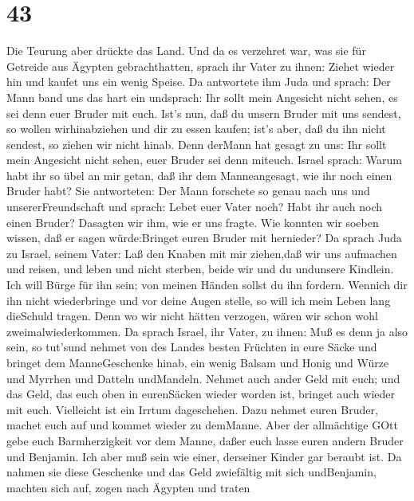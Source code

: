 \hypertarget{section-42}{%
\section{43}\label{section-42}}

 Die Teurung aber drückte das Land.  Und da es
verzehret war, was sie für Getreide aus Ägypten gebrachthatten, sprach
ihr Vater zu ihnen: Ziehet wieder hin und kaufet uns ein wenig Speise.
 Da antwortete ihm Juda und sprach: Der Mann band uns das
hart ein undsprach: Ihr sollt mein Angesicht nicht sehen, es sei denn
euer Bruder mit euch.  Ist's nun, daß du unsern Bruder mit
uns sendest, so wollen wirhinabziehen und dir zu essen kaufen;
 ist's aber, daß du ihn nicht sendest, so ziehen wir nicht
hinab. Denn derMann hat gesagt zu uns: Ihr sollt mein Angesicht nicht
sehen, euer Bruder sei denn miteuch.  Israel sprach: Warum
habt ihr so übel an mir getan, daß ihr dem Manneangesagt, wie ihr noch
einen Bruder habt?  Sie antworteten: Der Mann forschete so
genau nach uns und unsererFreundschaft und sprach: Lebet euer Vater
noch? Habt ihr auch noch einen Bruder? Dasagten wir ihm, wie er uns
fragte. Wie konnten wir soeben wissen, daß er sagen würde:Bringet euren
Bruder mit hernieder?  Da sprach Juda zu Israel, seinem
Vater: Laß den Knaben mit mir ziehen,daß wir uns aufmachen und reisen,
und leben und nicht sterben, beide wir und du undunsere Kindlein.
 Ich will Bürge für ihn sein; von meinen Händen sollst du
ihn fordern. Wennich dir ihn nicht wiederbringe und vor deine Augen
stelle, so will ich mein Leben lang dieSchuld tragen.  Denn
wo wir nicht hätten verzogen, wären wir schon wohl zweimalwiederkommen.
 Da sprach Israel, ihr Vater, zu ihnen: Muß es denn ja also
sein, so tut'sund nehmet von des Landes besten Früchten in eure Säcke
und bringet dem ManneGeschenke hinab, ein wenig Balsam und Honig und
Würze und Myrrhen und Datteln undMandeln.  Nehmet auch
ander Geld mit euch; und das Geld, das euch oben in eurenSäcken wieder
worden ist, bringet auch wieder mit euch. Vielleicht ist ein Irrtum
dageschehen.  Dazu nehmet euren Bruder, machet euch auf und
kommet wieder zu demManne.  Aber der allmächtige GOtt gebe
euch Barmherzigkeit vor dem Manne, daßer euch lasse euren andern Bruder
und Benjamin. Ich aber muß sein wie einer, derseiner Kinder gar beraubt
ist.  Da nahmen sie diese Geschenke und das Geld zwiefältig
mit sich undBenjamin, machten sich auf, zogen nach Ägypten und traten
